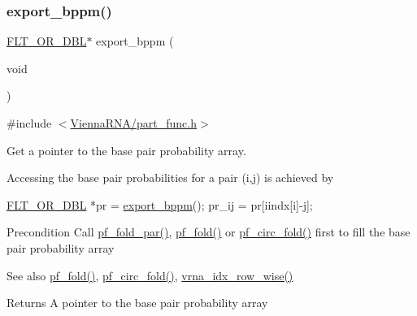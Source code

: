 \subsubsection{\texorpdfstring{export\+\_\+bppm()}{export\_bppm()}}
{\footnotesize\ttfamily \hyperlink{group__data__structures_ga31125aeace516926bf7f251f759b6126}{F\+L\+T\+\_\+\+O\+R\+\_\+\+D\+BL}$\ast$ export\+\_\+bppm (\begin{DoxyParamCaption}\item[{void}]{ }\end{DoxyParamCaption})}



{\ttfamily \#include $<$\hyperlink{part__func_8h}{Vienna\+R\+N\+A/part\+\_\+func.\+h}$>$}



Get a pointer to the base pair probability array. 

Accessing the base pair probabilities for a pair (i,j) is achieved by 
\begin{DoxyCode}
\hyperlink{group__data__structures_ga31125aeace516926bf7f251f759b6126}{FLT\_OR\_DBL} *pr  = \hyperlink{group__part__func__global__deprecated_gac5ac7ee281aae1c5cc5898a841178073}{export\_bppm}();
pr\_ij           = pr[iindx[i]-j];
\end{DoxyCode}


\begin{DoxyPrecond}{Precondition}
Call \hyperlink{group__part__func__global__deprecated_gac4f95bee734b2563a3d6e9932117ebdf}{pf\+\_\+fold\+\_\+par()}, \hyperlink{group__part__func__global__deprecated_gadc3db3d98742427e7001a7fd36ef28c2}{pf\+\_\+fold()} or \hyperlink{group__part__func__global__deprecated_ga819ce5fca8984004ac81c4a3b04cb735}{pf\+\_\+circ\+\_\+fold()} first to fill the base pair probability array
\end{DoxyPrecond}
\begin{DoxySeeAlso}{See also}
\hyperlink{group__part__func__global__deprecated_gadc3db3d98742427e7001a7fd36ef28c2}{pf\+\_\+fold()}, \hyperlink{group__part__func__global__deprecated_ga819ce5fca8984004ac81c4a3b04cb735}{pf\+\_\+circ\+\_\+fold()}, \hyperlink{group__utils_ga70b180e9ea764218a82647a1cd347445}{vrna\+\_\+idx\+\_\+row\+\_\+wise()}
\end{DoxySeeAlso}
\begin{DoxyReturn}{Returns}
A pointer to the base pair probability array 
\end{DoxyReturn}
\mbox{\label{group__part__func__global__deprecated_ga42faebdfce6f070c5f89adfc8427525c}} 
